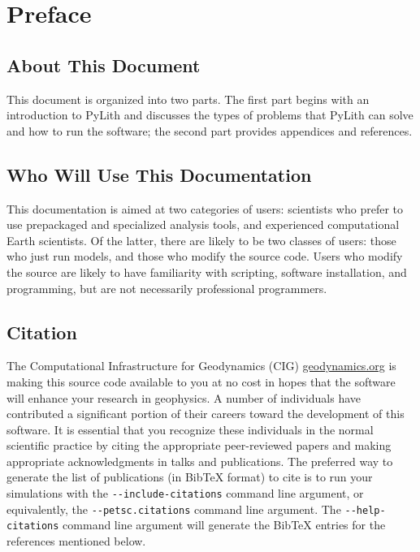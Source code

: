 
\chapter{Preface}


\section{About This Document}

This document is organized into two parts. The first part begins with
an introduction to PyLith and discusses the types of problems that
PyLith can solve and how to run the software; the second part provides
appendices and references.


\section{Who Will Use This Documentation}

This documentation is aimed at two categories of users: scientists
who prefer to use prepackaged and specialized analysis tools, and
experienced computational Earth scientists. Of the latter, there are
likely to be two classes of users: those who just run models, and
those who modify the source code. Users who modify the source are
likely to have familiarity with scripting, software installation,
and programming, but are not necessarily professional programmers.


\section{Citation}

The Computational Infrastructure for Geodynamics (CIG) \url{geodynamics.org}
is making this source code available to you at no cost in hopes that
the software will enhance your research in geophysics. A number of
individuals have contributed a significant portion of their careers
toward the development of this software. It is essential that you
recognize these individuals in the normal scientific practice by citing
the appropriate peer-reviewed papers and making appropriate acknowledgments
in talks and publications. The preferred way to generate the list
of publications (in Bib\TeX{} format) to cite is to run your simulations
with the \texttt{-{}-include-citations} command line argument, or
equivalently, the \texttt{-{}-petsc.citations} command line argument.
The \texttt{-{}-help-citations} command line argument will generate
the Bib\TeX{} entries for the references mentioned below.

